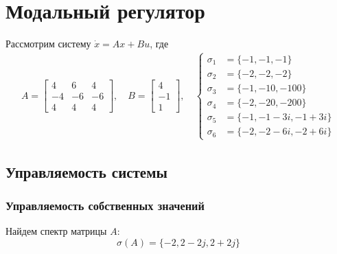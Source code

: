 \section{Модальный регулятор}

Рассмотрим систему $\dot{x} = Ax + Bu$, где 
\begin{equation}
    \begin{gathered}
        A = \begin{bmatrix}
            4 & 6 & 4 \\
            -4 & -6 & -6 \\
            4 & 4 & 4
        \end{bmatrix}, \quad
        B = \begin{bmatrix}
            4 \\
            -1 \\
            1
        \end{bmatrix}, \quad
        \begin{cases}
            \sigma_1 &= \{-1, -1, -1\} \\
            \sigma_2 &= \{-2, -2, -2\} \\
            \sigma_3 &= \{-1, -10, -100\} \\
            \sigma_4 &= \{-2, -20, -200\} \\
            \sigma_5 &= \{-1, -1 - 3i, -1 + 3i\} \\
            \sigma_6 &= \{-2, -2 - 6i, -2 + 6i\}
        \end{cases}
    \end{gathered}
\end{equation}

\subsection{Управляемость системы}

\subsubsection{Управляемость собственных значений}
Найдем спектр матрицы $A$:
\begin{equation}
    \sigma(A) = \{-2, 2-2j, 2+2j\}
\end{equation}

